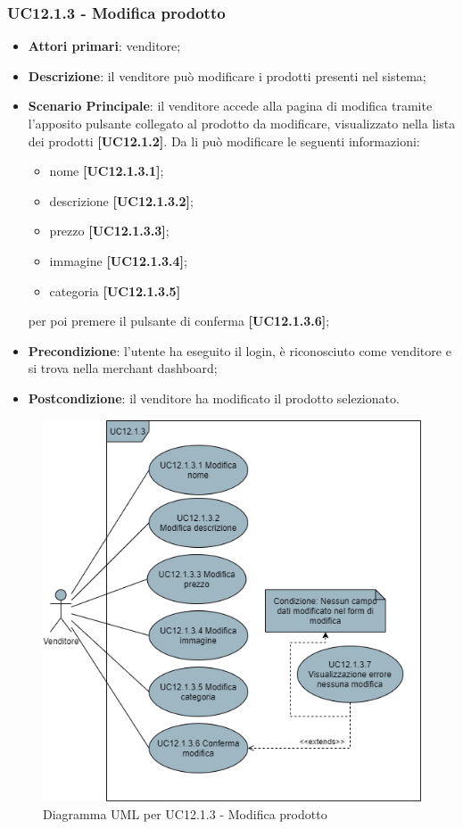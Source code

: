 \subsubsection{UC12.1.3 - Modifica prodotto}
\begin{itemize}
\item \textbf{Attori primari}: venditore;
\item \textbf{Descrizione}: il venditore può modificare i prodotti presenti nel sistema;
\item \textbf{Scenario Principale}: il venditore accede alla pagina di modifica tramite l'apposito pulsante collegato al prodotto da modificare, visualizzato nella lista dei prodotti \textbf{[UC12.1.2]}. Da li può modificare le seguenti informazioni:
\begin{itemize}
	\item nome \textbf{[UC12.1.3.1]};
	\item descrizione \textbf{[UC12.1.3.2]};
	\item prezzo \textbf{[UC12.1.3.3]};
	\item immagine \textbf{[UC12.1.3.4]};
	\item categoria \textbf{[UC12.1.3.5]}
\end{itemize}
per poi premere il pulsante di conferma \textbf{[UC12.1.3.6]};
\item \textbf{Precondizione}: l'utente ha eseguito il login, è riconosciuto come venditore e si trova nella merchant dashboard;
\item \textbf{Postcondizione}: il venditore ha modificato il prodotto selezionato.
\end{itemize}

\begin{figure}[H]
\centering
\includegraphics[scale=0.6]{res/UseCase/Immagini/ModificaProdotto}
\caption{Diagramma UML per UC12.1.3 - Modifica prodotto}
\end{figure}

